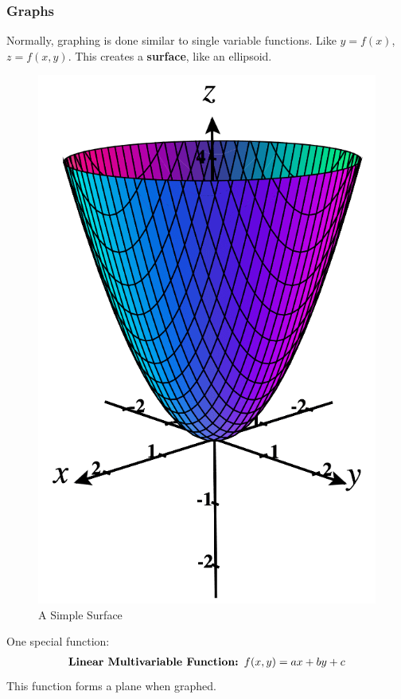 \documentclass{article}
\begin{document}
\subsubsection{Graphs}
Normally, graphing is done similar to single variable functions. Like $y = f(x)$, $z = f(x,y)$. This creates a \textbf{surface}, like an ellipsoid.
\begin{figure}[H]
\begin{center}
\includegraphics[scale=0.2]{Graphingf.png}
\caption{A Simple Surface}
\label{surface}
\end{center}
\end{figure}
One special function:
\begin{gather*}
    \textrm{\textbf{Linear Multivariable Function: }} f(x,y) = ax + by + c
\end{gather*}
This function forms a plane when graphed.
\end{document}
